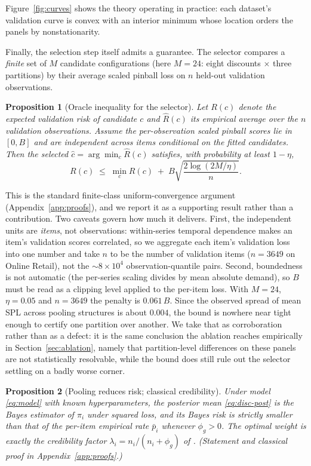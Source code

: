 \documentclass[twocolumn,10pt]{article}
\newtheorem{proposition}{Proposition}
\begin{document}
Figure~\ref{fig:curves} shows the theory operating in practice: each
dataset's validation curve is convex with an interior minimum whose
location orders the panels by nonstationarity.

Finally, the selection step itself admits a guarantee. The selector
compares a \emph{finite} set of $M$ candidate configurations (here
$M=24$: eight discounts $\times$ three partitions) by their average
scaled pinball loss on $n$ held-out validation observations.

\begin{proposition}[Oracle inequality for the selector]
\label{prop:oracle}
Let $R(c)$ denote the expected validation risk of candidate $c$ and
$\hat R(c)$ its empirical average over the $n$ validation observations.
Assume the per-observation scaled pinball scores lie in $[0,B]$ and are
independent across items conditional on the fitted candidates. Then the
selected $\hat c=\arg\min_c \hat R(c)$ satisfies, with probability at
least $1-\eta$,
\[
R(\hat c)\;\le\;\min_{c} R(c)\;+\;B\sqrt{\frac{2\log(2M/\eta)}{n}} .
\]
\end{proposition}

This is the standard finite-class uniform-convergence argument
(Appendix~\ref{app:proofs}), and we report it as a supporting result
rather than a contribution. Two caveats govern how much it delivers.
First, the independent units are \emph{items}, not observations:
within-series temporal dependence makes an item's validation scores
correlated, so we aggregate each item's validation loss into one number
and take $n$ to be the number of validation items ($n=3649$ on Online
Retail), not the ${\sim}8\times10^4$ observation-quantile pairs. Second,
boundedness is not automatic (the per-series scaling divides by mean
absolute demand), so $B$ must be read as a clipping level applied to the
per-item loss. With $M=24$, $\eta=0.05$ and $n=3649$ the penalty is
$0.061\,B$. Since the observed spread of mean SPL across pooling
structures is about $0.004$, the bound is nowhere near tight enough to
certify one partition over another. We take that as corroboration rather
than as a defect: it is the same conclusion the ablation reaches
empirically in Section~\ref{sec:ablation}, namely that partition-level
differences on these panels are not statistically resolvable, while the
bound does still rule out the selector settling on a badly worse corner.

\begin{proposition}[Pooling reduces risk; classical credibility]
\label{prop:credibility}
Under model \eqref{eq:model} with known hyperparameters, the posterior
mean \eqref{eq:disc-post} is the Bayes estimator of $\pi_i$ under
squared loss, and its Bayes risk is strictly smaller than that of the
per-item empirical rate $\bar p_i$ whenever $\phi_g>0$. The optimal
weight is exactly the credibility factor
$\lambda_i=n_i/(n_i+\phi_g)$ of \citet{buhlmann1967}. (Statement and
classical proof in Appendix~\ref{app:proofs}.)
\end{proposition}
\end{document}
